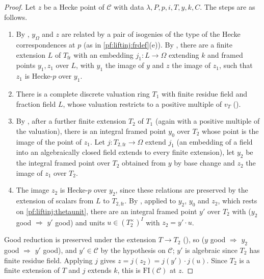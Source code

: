 \begin{proof}
Let $z$ be a Hecke point of $\mathcal C$ with data $\lambda,P,p,i,T,y,k,C$. The steps are as follows.
\begin{enumerate}[label=\arabic*.]
\item By , $y_\Omega$ and $z$ are related by a pair of isogenies of the type
of the Hecke correspondences at $p$ (as in \cref{pf:liftinj:frdef}(e)). By , there are a finite
extension $L$ of $T_{\mathrm{fr}}$ with an
embedding $j_1:L\to\Omega$ extending $k$ and framed points $y_1,z_1$ over $L$, with $y_1$ the image of $y$ and $z$ the image of $z_1$, such that $z_1$
is Hecke-$p$ over $y_1$.
\item There is a complete discrete valuation ring $T_1$ with finite residue field and fraction field $L$, whose valuation restricts to a positive
multiple of $v_T$ ().
\item By , after a further finite extension $T_2$ of $T_1$ (again with a positive multiple of the valuation),
there is an integral framed point $y_0$ over $T_2$ whose point is the image of the point of $z_1$. Let $j:T_{2,\mathrm{fr}}\to\Omega$ extend $j_1$
(an embedding of a field into an algebraically closed field extends to every finite extension), let $y_2$ be the integral
framed point over $T_2$ obtained from $y$ by base change and $z_2$ the image of $z_1$ over $T_2$.
\item The image $z_2$ is Hecke-$p$ over $y_2$, since these relations are preserved by the extension of scalars from $L$ to $T_{2,\mathrm{fr}}$. By
, applied to $y_2$, $y_0$ and $z_2$, which rests on \cref{pf:liftinj:thetaunit}, there are an
integral framed point $y'$ over $T_2$ with ($y_2$ good $\Rightarrow$ $y'$ good) and units $u\in(T_2^\times)^I$ with $z_2=y'\cdot u$.
\end{enumerate}
Good reduction is preserved under the extension $T\to T_2$ (), so ($y$ good
$\Rightarrow$ $y_2$ good $\Rightarrow$ $y'$ good), and $y'\in\mathcal C$ by the hypothesis on $\mathcal C$; $y'$ is algebraic since $T_2$ has finite residue
field. Applying $j$ gives $z=j(z_2)=j(y')\cdot j(u)$. Since $T_2$ is a finite extension of $T$ and $j$ extends $k$, this is $\mathrm{FI}(\mathcal C)$ at $z$.
\end{proof}

